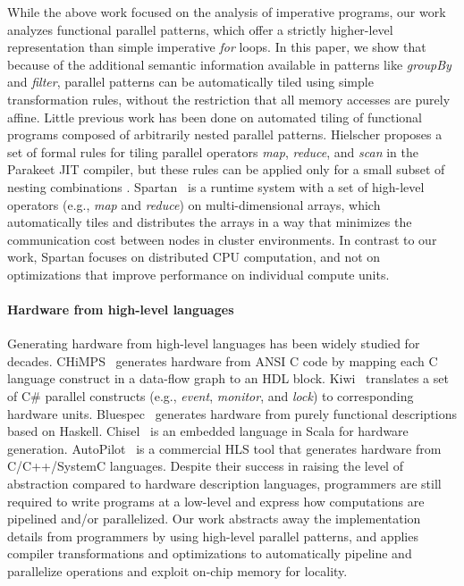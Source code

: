 \documentclass[pageno]{jpaper}
\begin{document}
While the above work focused on the analysis of imperative programs, our work
analyzes functional parallel patterns, which offer a strictly higher-level representation
than simple imperative \emph{for} loops.
In this paper, we show that because of the additional semantic information
available in patterns like \emph{groupBy} and \emph{filter},
parallel patterns can be automatically tiled using
simple transformation rules, without the restriction that all memory accesses
are purely affine.
Little previous work has been done on automated tiling of functional
programs composed of arbitrarily nested parallel patterns.
Hielscher proposes a set of formal rules for tiling parallel operators \emph{map}, \emph{reduce}, and \emph{scan}
in the Parakeet JIT compiler, but these rules can be applied only for a small subset of nesting combinations \cite{parakeet}.
Spartan~\cite{spartan} is a runtime system with a set of high-level operators
(e.g., \emph{map} and \emph{reduce}) on multi-dimensional arrays, which
automatically tiles and distributes the arrays in a way that minimizes the
communication cost between nodes in cluster environments. In contrast to
our work, Spartan
focuses on distributed CPU computation, and not on optimizations that improve
performance on individual compute units.





\paragraph{Hardware from high-level languages}
Generating hardware from high-level languages has been widely studied for
decades.  CHiMPS~\cite{chimps} generates hardware from ANSI C code by
mapping each C language construct in a data-flow graph to an HDL block.
Kiwi~\cite{kiwi} translates a set of C\# parallel constructs (e.g.,
\emph{event}, \emph{monitor}, and \emph{lock}) to corresponding hardware units.
Bluespec~\cite{bluespec} generates hardware from purely functional descriptions
based on Haskell.  Chisel~\cite{chisel} is an embedded language in Scala
for hardware generation.  AutoPilot~\cite{autopilot} is a commercial HLS
tool that generates hardware from C/C++/SystemC languages.  Despite their
success in raising the level of abstraction compared to hardware description
languages, programmers are still required to write programs at a low-level and
express how computations are pipelined and/or parallelized.  Our work
abstracts away the implementation details from programmers by using high-level
parallel patterns, and applies compiler transformations and optimizations to
automatically pipeline and parallelize operations and exploit on-chip memory
for locality.
\end{document}
